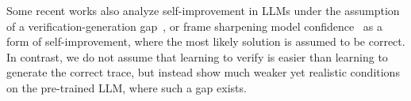 Some recent works also analyze self-improvement in LLMs under the assumption of a verification-generation gap~\cite{song2024mind}, or frame sharpening model confidence~\cite{huang2024self} as a form of self-improvement, where the most likely solution is assumed to be correct. In contrast, we do not assume that learning to verify is easier than learning to generate the correct trace, but instead show much weaker yet realistic conditions on the pre-trained LLM, where such a gap exists.









